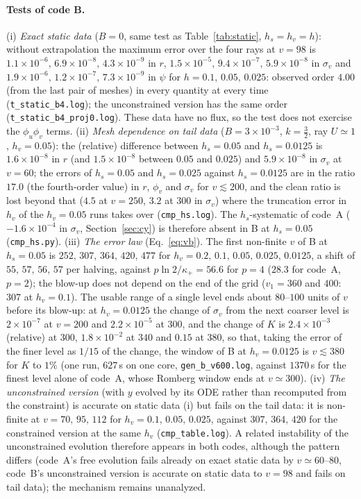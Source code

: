\documentclass[11pt]{article}
\begin{document}
\paragraph{Tests of code B.} (i) \emph{Exact static data} ($B=0$, same test as Table~\ref{tab:static}, $h_s=h_v=h$): without extrapolation the maximum error over the four rays at $v=98$ is $1.1\times10^{-6},\,6.9\times10^{-8},\,4.3\times10^{-9}$ in $r$, $1.5\times10^{-5},\,9.4\times10^{-7},\,5.9\times10^{-8}$ in $\sigma_v$ and $1.9\times10^{-6},\,1.2\times10^{-7},\,7.3\times10^{-9}$ in $\psi$ for $h=0.1,\,0.05,\,0.025$: observed order $4.00$ (from the last pair of meshes) in every quantity at every time (\texttt{t\_static\_b4.log}); the unconstrained version has the same order (\texttt{t\_static\_b4\_proj0.log}). These data have no flux, so the test does not exercise the $\phi_u\phi_v$ terms. (ii) \emph{Mesh dependence on tail data} ($B=3\times10^{-3}$, $k=\tfrac32$, ray $U\simeq1$, $h_v=0.05$): the (relative) difference between $h_s=0.05$ and $h_s=0.0125$ is $1.6\times10^{-8}$ in $r$ (and $1.5\times10^{-8}$ between $0.05$ and $0.025$) and $5.9\times10^{-8}$ in $\sigma_v$ at $v=60$; the errors of $h_s=0.05$ and $h_s=0.025$ against $h_s=0.0125$ are in the ratio $17.0$ (the fourth-order value) in $r$, $\phi_v$ and $\sigma_v$ for $v\lesssim200$, and the clean ratio is lost beyond that ($4.5$ at $v=250$, $3.2$ at $300$ in $\sigma_v$) where the truncation error in $h_v$ of the $h_v=0.05$ runs takes over (\texttt{cmp\_hs.log}). The $h_s$-systematic of code~A ($-1.6\times10^{-4}$ in $\sigma_v$, Section~\ref{sec:cy}) is therefore absent in B at $h_s=0.05$ (\texttt{cmp\_hs.py}). (iii) \emph{The error law} (Eq.~\eqref{eq:vb}). The first non-finite $v$ of B at $h_s=0.05$ is $252,\,307,\,364,\,420,\,477$ for $h_v=0.2,\,0.1,\,0.05,\,0.025,\,0.0125$, a shift of $55,\,57,\,56,\,57$ per halving, against $p\ln2/\kappa_+=56.6$ for $p=4$ ($28.3$ for code~A, $p=2$); the blow-up does not depend on the end of the grid ($v_1=360$ and $400$: $307$ at $h_v=0.1$). The usable range of a single level ends about $80$--$100$ units of $v$ before its blow-up: at $h_v=0.0125$ the change of $\sigma_v$ from the next coarser level is $2\times10^{-7}$ at $v=200$ and $2.2\times10^{-5}$ at $300$, and the change of $K$ is $2.4\times10^{-3}$ (relative) at $300$, $1.8\times10^{-2}$ at $340$ and $0.15$ at $380$, so that, taking the error of the finer level as $1/15$ of the change, the window of B at $h_v=0.0125$ is $v\lesssim380$ for $K$ to $1\%$ (one run, $627\,$s on one core, \texttt{gen\_b\_v600.log}, against $1370\,$s for the finest level alone of code~A, whose Romberg window ends at $v\simeq300$). (iv) \emph{The unconstrained version} (with $y$ evolved by its ODE rather than recomputed from the constraint) is accurate on static data (i) but fails on the tail data: it is non-finite at $v=70,\,95,\,112$ for $h_v=0.1,\,0.05,\,0.025$, against $307,\,364,\,420$ for the constrained version at the same $h_v$ (\texttt{cmp\_table.log}). A related instability of the unconstrained evolution therefore appears in both codes, although the pattern differs (code~A's free evolution fails already on exact static data by $v\simeq60$--$80$, code~B's unconstrained version is accurate on static data to $v=98$ and fails on tail data); the mechanism remains unanalyzed.
\end{document}
